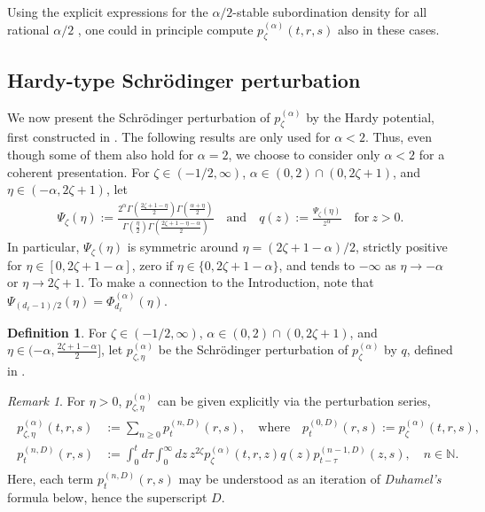 \documentclass[12pt,reqno]{amsart}
\theoremstyle{definition}
\newtheorem{definition}[theorem]{Definition}
\theoremstyle{remark}
\newtheorem{remark}[theorem]{Remark}
\numberwithin{equation}{section}
\newcommand{\1}{\mathbbm{1}}
\newcommand{\N}{\mathbb{N}}
\begin{document}
Using the explicit expressions for the $\alpha/2$-stable subordination density for all rational $\alpha/2$ \cite{PensonGorska2010}, one could in principle compute $p_\zeta^{(\alpha)}(t,r,s)$ also in these cases.


\subsection{Hardy-type Schr\"odinger perturbation}
\label{ss:defperturbedsemigroup}

We now present the Schr\"odinger perturbation of $p_\zeta^{(\alpha)}$ by the Hardy potential, first constructed in \cite{Bogdanetal2024}.
The following results are only used for $\alpha<2$. Thus, even though some of them also hold for $\alpha=2$, we choose to consider only $\alpha<2$ for a coherent presentation.
For $\zeta\in(-1/2,\infty)$, $\alpha\in(0,2)\cap(0,2\zeta+1)$, and $\eta\in(-\alpha,2\zeta+1)$, let
\begin{align}
  \label{eq:defpsietazetaOLD}
  \Psi_\zeta(\eta) := \frac{2^\alpha\Gamma\left(\frac{2\zeta+1-\eta}{2}\right)\Gamma\left(\frac{\alpha+\eta}{2}\right)}{\Gamma\left(\frac{\eta}{2}\right)\Gamma\left(\frac{2\zeta+1-\eta-\alpha}{2}\right)}
  \quad \text{and} \quad
  q(z) := \frac{\Psi_\zeta(\eta)}{z^\alpha} \quad \text{for} \ z>0.
\end{align}\index{$\Psi_\zeta(\eta)$}
In particular, $\Psi_\zeta(\eta)$ is symmetric around $\eta=(2\zeta+1-\alpha)/2$, strictly positive for $\eta\in[0,2\zeta+1-\alpha]$, zero if $\eta\in\{0,2\zeta+1-\alpha\}$, and tends to $-\infty$ as $\eta\to-\alpha$ or $\eta\to2\zeta+1$. To make a connection to the Introduction, note that $\Psi_{(d_\ell-1)/2}(\eta)=\Phi_{d_\ell}^{(\alpha)}(\eta)$.

\begin{definition}
  \label{deffeynmankactransformed}
  For $\zeta\in(-1/2,\infty)$, $\alpha\in(0,2)\cap(0,2\zeta+1)$, and $\eta\in (-\alpha,\frac{2\zeta+1-\alpha}{2}]$, let $p_{\zeta,\eta}^{(\alpha)}$ be the Schr\"odinger perturbation of $p_\zeta^{(\alpha)}$ by $q$, defined in \cite[Definition~1.5]{Bogdanetal2024}.
\end{definition}

\begin{remark}
For \( \eta > 0 \), \( p_{\zeta, \eta}^{(\alpha)} \) can be given explicitly via the perturbation series,
  \begin{align}
    \label{eq:feynmankactransformed}
    \begin{split}
      p_{\zeta,\eta}^{(\alpha)}(t,r,s)
      & := \sum_{n\geq0} p_t^{(n,D)}(r,s), \quad \mbox{where}\quad 
        p_t^{(0,D)}(r,s) := p_\zeta^{(\alpha)}(t,r,s), \\
      p_t^{(n,D)}(r,s) & := \int_0^t d\tau \int_0^\infty dz\, z^{2\zeta} p_\zeta^{(\alpha)}(t,r,z) q(z) p_{t-\tau}^{(n-1,D)}(z,s), \quad n\in\N.
    \end{split}
  \end{align}Here, each term $p_t^{(n,D)}(r,s)$ may be understood as an iteration of \emph{Duhamel's} formula below, hence the superscript $D$.
\end{remark}
\end{document}
